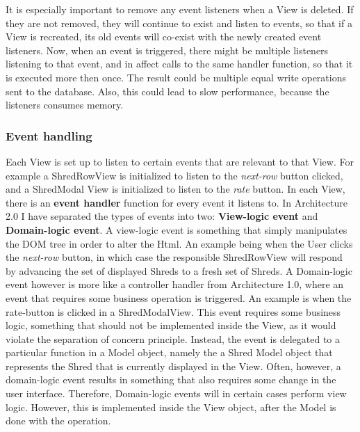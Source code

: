 It is especially important to remove any event listeners when a View is deleted. If they are not removed, they will continue to exist and listen to events, so that if a View is recreated, its old events will co-exist with the newly created event listeners. Now, when an event is triggered, there might be multiple listeners listening to that event, and in affect calls to the same handler function, so that it is executed more then once. The result could be multiple equal write operations sent to the database. Also, this could lead to slow performance, because the listeners consumes memory.

\subsubsection{Event handling}
Each View is set up to listen to certain events that are relevant to that View. For example a ShredRowView is initialized to listen to the \textit{next-row} button clicked, and a ShredModal View is initialized to listen to the \textit{rate} button. In each View, there is an \textbf{event handler} function for every event it listens to. In Architecture 2.0 I have separated the types of events into two: \textbf{View-logic event} and \textbf{Domain-logic event}. A view-logic event is something that simply manipulates the DOM tree in order to alter the Html. An example being when the User clicks the \textit{next-row} button, in which case the responsible ShredRowView will respond by advancing the set of displayed Shreds to a fresh set of Shreds. A Domain-logic event however is more like a controller handler from Architecture 1.0, where an event that requires some business operation is triggered. An example is when the rate-button is clicked in a ShredModalView. This event requires some business logic, something that should not be implemented inside the View, as it would violate the separation of concern principle. Instead, the event is delegated to a particular function in a Model object, namely the a Shred Model object that represents the Shred that is currently displayed in the View. Often, however, a domain-logic event results in something that also requires some change in the user interface. Therefore, Domain-logic events will in certain cases perform view logic. However, this is implemented inside the View object, after the Model is done with the operation.

